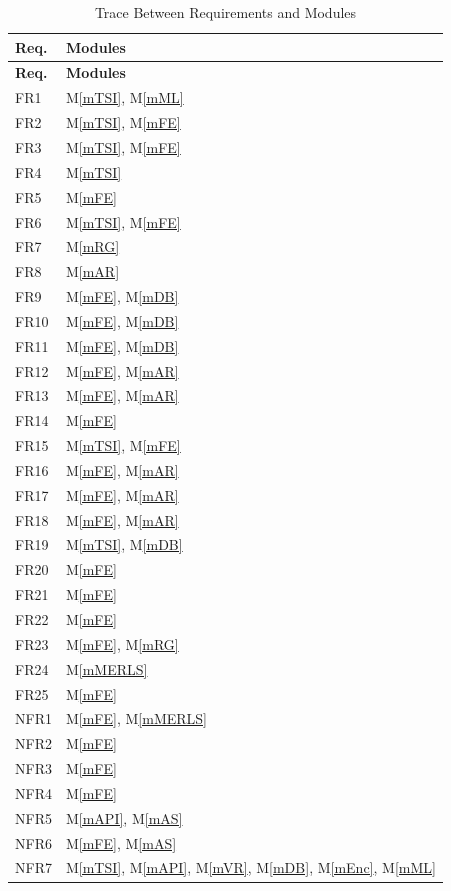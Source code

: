 \documentclass[12pt, titlepage]{article}
\newcommand{\mref}[1]{M\ref{#1}}
\begin{document}
\begin{longtable}{p{} p{}}
\caption{Trace Between Requirements and Modules}
\label{TblRT}\\
\toprule
\textbf{Req.} & \textbf{Modules}\\
\midrule
\endfirsthead
\toprule
\textbf{Req.} & \textbf{Modules}\\
\midrule
\endhead
FR1 & \mref{mTSI}, \mref{mML}\\
FR2 & \mref{mTSI}, \mref{mFE}\\
FR3 & \mref{mTSI}, \mref{mFE}\\
FR4 & \mref{mTSI}\\
FR5 & \mref{mFE}\\
FR6 & \mref{mTSI}, \mref{mFE}\\
FR7 & \mref{mRG}\\
FR8 & \mref{mAR}\\
FR9 & \mref{mFE}, \mref{mDB}\\
FR10 & \mref{mFE}, \mref{mDB}\\
FR11 & \mref{mFE}, \mref{mDB}\\
FR12 & \mref{mFE}, \mref{mAR}\\
FR13 & \mref{mFE}, \mref{mAR}\\
FR14 & \mref{mFE}\\
FR15 & \mref{mTSI}, \mref{mFE}\\
FR16 & \mref{mFE}, \mref{mAR}\\
FR17 & \mref{mFE}, \mref{mAR}\\
FR18 & \mref{mFE}, \mref{mAR}\\
FR19 & \mref{mTSI}, \mref{mDB}\\
FR20 & \mref{mFE}\\
FR21 & \mref{mFE}\\
FR22 & \mref{mFE}\\
FR23 & \mref{mFE}, \mref{mRG}\\
FR24 & \mref{mMERLS}\\
FR25 & \mref{mFE}\\
NFR1 & \mref{mFE}, \mref{mMERLS}\\
NFR2 & \mref{mFE}\\
NFR3 & \mref{mFE}\\
NFR4 & \mref{mFE}\\
NFR5 & \mref{mAPI}, \mref{mAS}\\
NFR6 & \mref{mFE}, \mref{mAS}\\
NFR7 & \mref{mTSI}, \mref{mAPI}, \mref{mVR}, \mref{mDB}, \mref{mEnc}, \mref{mML}\\

\end{longtable}
\end{document}
